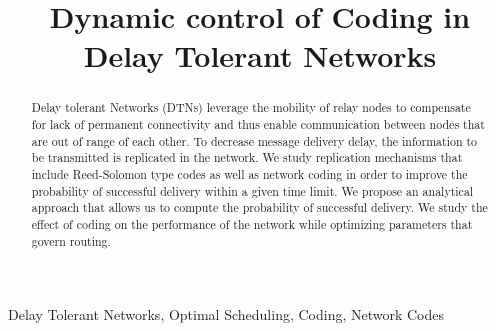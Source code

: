 \documentclass[10pt,twocolumn,conference,final]{IEEEtran}
\begin{document}
 
\baselineskip 4.044mm
\title{\LARGE Dynamic control of Coding in Delay Tolerant
Networks} \author{
\and
{}
\and
{}
}
\date{} \maketitle
\begin{abstract}
Delay tolerant Networks (DTNs) leverage the mobility of relay nodes to
compensate for lack of permanent connectivity and thus enable
communication between nodes that are out of range of each other. To
decrease message delivery delay, the information to be transmitted
is replicated in the network. We study replication mechanisms that include
Reed-Solomon type codes as well as network coding in order to improve the
probability of successful delivery within a given time limit.
We propose an analytical approach that allows us to compute the probability
of successful delivery.  We study the effect of
coding on the performance of the network while optimizing parameters that
govern routing.
\end{abstract}
\begin{keywords}
Delay Tolerant Networks, Optimal Scheduling, Coding, Network Codes
\end{keywords}
\thispagestyle{empty}
\thispagestyle{empty}
\end{document}
